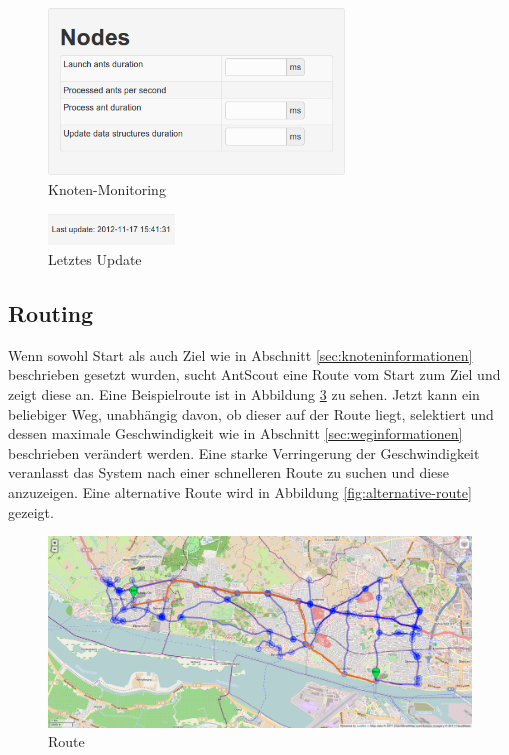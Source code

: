 \begin{figure}[htbp]
  \centering
  \includegraphics[width=0.7\textwidth]{Bilder/Knoten-Monitoring.png}
  \caption{Knoten-Monitoring}
  \label{fig:knoten-monitoring}
\end{figure}

\begin{figure}[htbp]
  \centering
  \includegraphics[width=0.3\textwidth]{Bilder/Letztes-Update.png}
  \caption{Letztes Update}
  \label{fig:letztes-update}
\end{figure}

\subsection{Routing}
\label{sec:routing}

Wenn sowohl Start als auch Ziel wie in Abschnitt \ref{sec:knoteninformationen} beschrieben gesetzt wurden, sucht AntScout eine Route vom Start zum Ziel und zeigt diese an.
Eine Beispielroute ist in Abbildung \ref{fig:route} zu sehen.
Jetzt kann ein beliebiger Weg, unabhängig davon, ob dieser auf der Route liegt, selektiert und dessen maximale Geschwindigkeit wie in Abschnitt \ref{sec:weginformationen} beschrieben verändert werden.
Eine starke Verringerung der Geschwindigkeit veranlasst das System nach einer schnelleren Route zu suchen und diese anzuzeigen.
Eine alternative Route wird in Abbildung \ref{fig:alternative-route} gezeigt.

\begin{figure}[htbp]
  \centering
  \includegraphics[width=\textwidth]{Bilder/Route.png}
  \caption{Route}
  \label{fig:route}
\end{figure}


